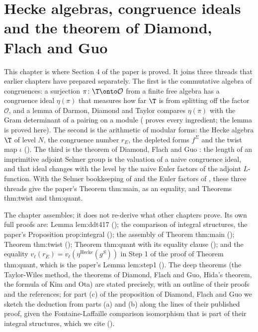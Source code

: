 \chapter{Hecke algebras, congruence ideals and the theorem of Diamond, Flach and Guo}\label{ch:congruence}

This chapter is where Section 4 of the paper is proved. It joins three threads that earlier chapters have prepared separately. The first is
the commutative algebra of congruences: a surjection $\pi\colon\T\onto\mathcal O$ from a finite free algebra has a congruence ideal $\eta(\pi)$ that measures how
far $\T$ is from splitting off the factor $\mathcal O$, and a lemma of Darmon, Diamond and Taylor compares $\eta(\pi)$ with the Gram determinant of a pairing on a
module ( proves every ingredient; the lemma is proved here). The second is the arithmetic of modular forms: the Hecke algebra $\T$ of
level $N$, the congruence number $r_E$, the depleted forms $f^\Sigma$ and the twist map $\iota$ (). The third is the
theorem of Diamond, Flach and Guo \cite{DFG04}: the length of an imprimitive adjoint Selmer group is the valuation of a naive congruence ideal, and that
ideal changes with the level by the naive Euler factors of the adjoint $L$-function. With the Selmer bookkeeping of  and the Euler
factors of , these three threads give the paper's Theorem thm:main, as an equality, and Theorems thm:twist and thm:quant.

The chapter assembles; it does not re-derive what other chapters prove. Its own full proofs are: Lemma lem:ddt417 (); the comparison of integral structures, the paper's
Proposition prop:integral (); the assembly of Theorem thm:main
(); Theorem thm:twist (); Theorem thm:quant with its equality clause (); and
the equality $v_\ell(r_E)=v_\ell(\eta^{\mathrm{Hecke}}(g^S))$ in Step 1 of the proof of Theorem thm:quant, which is the paper's Lemma lem:step1
(). The deep theorems (the Taylor-Wiles method, the theorems of Diamond, Flach and Guo, Hida's theorem, the formula of
Kim and Ota) are stated precisely, with an outline of their proofs and the references; for part (c) of the proposition of Diamond, Flach and Guo we sketch the
deduction from parts (a) and (b) along the lines of their published proof, given the Fontaine-Laffaille comparison isomorphism that is part of their integral structures, which we cite ().

